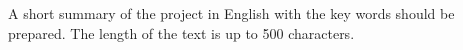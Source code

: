 A short summary of the project in English with the key words should be prepared. The length of the text is up to 500 characters.
